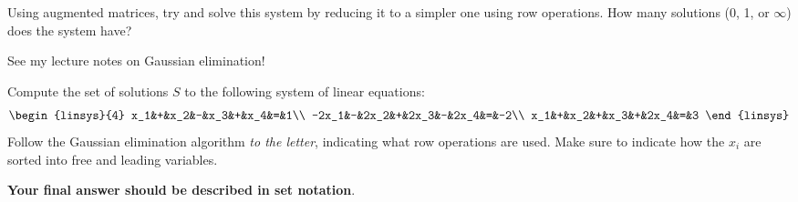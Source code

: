 Using augmented matrices, try and solve this system by reducing it to a simpler one using row operations. How many solutions (0, 1, or $\infty$) does the system have? 
\\
\begin{solution}
See my lecture notes on Gaussian elimination!
\end{solution}
\ii Compute the set of solutions $S$ to the following system of linear equations:
\[
\begin{linsys}{4}
x_1&+&x_2&-&x_3&+&x_4&=&1\\
-2x_1&-&2x_2&+&2x_3&-&2x_4&=&-2\\
x_1&+&x_2&+&x_3&+&2x_4&=&3
\end{linsys}
\]
Follow the Gaussian elimination algorithm {\em to the letter}, indicating what row operations are used. Make sure to indicate how the $x_i$ are sorted into free and leading variables. 

{\bf Your final answer should be described in set notation}. 

